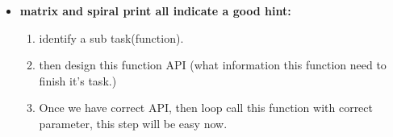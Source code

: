 \documentclass[a4paper,11pt,twoside]{book}
\begin{document}
\begin{itemize}
	
%		
%			
%				
%		
%	
%		
	
	\item \textbf{matrix and spiral print all indicate a good hint:} 
	\begin{enumerate}
		\item identify a sub task(function).
		
		\item then design this function API (what information this function need to finish it's task.) 
		
		\item Once we have correct API, then loop call this function with correct parameter, this step will be easy now. 
	\end{enumerate}
	
\end{itemize}
\end{document}
